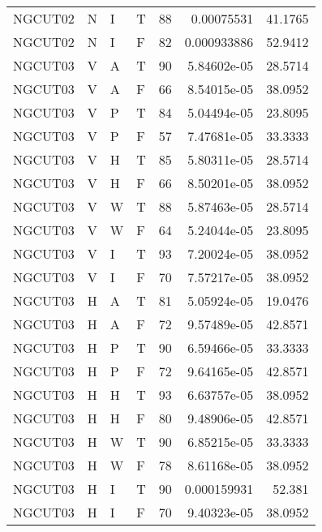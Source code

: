 \begin{longtable}{llllrrr}
    NGCUT02  & N     & I     & T          & 88         & 0.00075531  & 41.1765  \\
    NGCUT02  & N     & I     & F          & 82         & 0.000933886 & 52.9412  \\
    NGCUT03  & V     & A     & T          & 90         & 5.84602e-05 & 28.5714  \\
    NGCUT03  & V     & A     & F          & 66         & 8.54015e-05 & 38.0952  \\
    NGCUT03  & V     & P     & T          & 84         & 5.04494e-05 & 23.8095  \\
    NGCUT03  & V     & P     & F          & 57         & 7.47681e-05 & 33.3333  \\
    NGCUT03  & V     & H     & T          & 85         & 5.80311e-05 & 28.5714  \\
    NGCUT03  & V     & H     & F          & 66         & 8.50201e-05 & 38.0952  \\
    NGCUT03  & V     & W     & T          & 88         & 5.87463e-05 & 28.5714  \\
    NGCUT03  & V     & W     & F          & 64         & 5.24044e-05 & 23.8095  \\
    NGCUT03  & V     & I     & T          & 93         & 7.20024e-05 & 38.0952  \\
    NGCUT03  & V     & I     & F          & 70         & 7.57217e-05 & 38.0952  \\
    NGCUT03  & H     & A     & T          & 81         & 5.05924e-05 & 19.0476  \\
    NGCUT03  & H     & A     & F          & 72         & 9.57489e-05 & 42.8571  \\
    NGCUT03  & H     & P     & T          & 90         & 6.59466e-05 & 33.3333  \\
    NGCUT03  & H     & P     & F          & 72         & 9.64165e-05 & 42.8571  \\
    NGCUT03  & H     & H     & T          & 93         & 6.63757e-05 & 38.0952  \\
    NGCUT03  & H     & H     & F          & 80         & 9.48906e-05 & 42.8571  \\
    NGCUT03  & H     & W     & T          & 90         & 6.85215e-05 & 33.3333  \\
    NGCUT03  & H     & W     & F          & 78         & 8.61168e-05 & 38.0952  \\
    NGCUT03  & H     & I     & T          & 90         & 0.000159931 & 52.381   \\
    NGCUT03  & H     & I     & F          & 70         & 9.40323e-05 & 38.0952  \\

\end{longtable}
